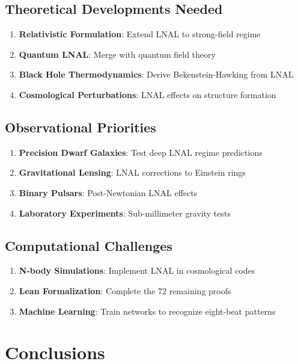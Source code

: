 \documentclass[12pt,a4paper]{article}
\begin{document}
\subsection{Theoretical Developments Needed}

\begin{enumerate}
\item \textbf{Relativistic Formulation}: Extend LNAL to strong-field regime
\item \textbf{Quantum LNAL}: Merge with quantum field theory
\item \textbf{Black Hole Thermodynamics}: Derive Bekenstein-Hawking from LNAL
\item \textbf{Cosmological Perturbations}: LNAL effects on structure formation
\end{enumerate}

\subsection{Observational Priorities}

\begin{enumerate}
\item \textbf{Precision Dwarf Galaxies}: Test deep LNAL regime predictions
\item \textbf{Gravitational Lensing}: LNAL corrections to Einstein rings
\item \textbf{Binary Pulsars}: Post-Newtonian LNAL effects
\item \textbf{Laboratory Experiments}: Sub-millimeter gravity tests
\end{enumerate}

\subsection{Computational Challenges}

\begin{enumerate}
\item \textbf{N-body Simulations}: Implement LNAL in cosmological codes
\item \textbf{Lean Formalization}: Complete the 72 remaining proofs
\item \textbf{Machine Learning}: Train networks to recognize eight-beat patterns
\end{enumerate}

\section{Conclusions}
\end{document}
